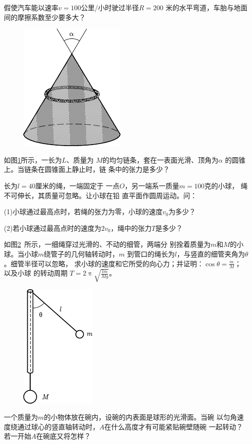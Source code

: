 \begin{exercises}
\exercise 假使汽车能以速率$  v = 1 0 0  $公里/小时驶过半径$  R = 2 0 0  $
米的水平弯道，车胎与地面间的摩擦系数至少要多大？

\begin{figure}
	\centering
	\includegraphics{figure/fig03.33}
	\caption{}
	\label{fig:03.33}
\end{figure}
\exercise 如图\ref{fig:03.33}所示，一长为$ L $、质量为
$ M $的均匀链条，套在一表面光滑、顶角为$ \alpha $
的圆锥上。当链条在圆锥面上静止时，链
条中的张力是多少？

\exercise 长为$  l = 4 0  $厘米的绳，一端固定于
一点$ O $，另一端系一质量$  m = 1 0 0  $克的小球，
绳不可伸长，其质量可忽略。让小球在铅
直平面作圆周运动。问：

(1)小球通过最高点时，若绳的张力为零，小球的速度$  v _ { 0 }  $为多少？

(2)若小球通过最高点时的速度为$  2 v _ { 0 }  $，绳中的张力$ T $是多少？

\exercise 如图\ref{fig:03.34}~所示，一细绳穿过光滑的、不动的细管，两端分
别拴着质量为$ m $和$ M $的小球。当小球$ m $绕管子的几何轴转动时，$ m $
到管口的绳长为$ l $，与竖直的细管夹角为$ \theta $。细管半径可以忽略，
求小球的速度和它所受的向心力；并证明：$  \cos \theta = \frac { m } { M }  $； 以及小球
的转动周期
$ T = 2 \uppi \sqrt{\frac { l m } { M g }}  $。

\begin{figure}
	\centering
	\includegraphics{figure/fig03.34}
	\caption{}
	\label{fig:03.34}
\end{figure}
\exercise 一个质量为$ m $的小物体放在碗内，设碗的内表面是球形的光滑面。当碗
以匀角速度绕通过球心的竖直轴转动时，$ A $在什么高度才有可能紧贴碗壁随碗
一起转动？若一开始$ A $在碗底又将怎样？


\end{exercises}
